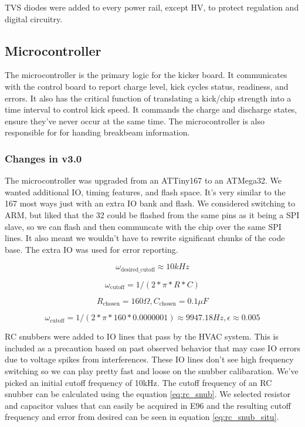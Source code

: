\documentclass[12pt, letterpaper]{article}
\begin{document}
TVS diodes were added to every power rail, except HV, to protect regulation and digital circuitry.

\subsection{Microcontroller}
The microcontroller is the primary logic for the kicker board. It communicates with the control board to report charge level, kick cycles status, readiness, and errors. It also has the critical function of translating a kick/chip strength into a time interval to control kick speed. It commands the charge and discharge states, ensure they've never occur at the same time. The microcontroller is also responsible for for handing breakbeam information.

\subsubsection{Changes in v3.0}
The microcontroller was upgraded from an ATTiny167 to an ATMega32. We wanted additional IO, timing features, and flash space. It's very similar to the 167 most ways just with an extra IO bank and flash. We considered switching to ARM, but liked that the 32 could be flashed from the same pins as it being a SPI slave, so we can flash and then communcate with the chip over the same SPI lines. It also meant we wouldn't have to rewrite significant chunks of the code base. The extra IO was used for error reporting.

$$ \omega_\mathrm{desired\_cutoff} \approx 10 kHz $$

\begin{equation} \label{eq:rc_snub}
\omega_\mathrm{cutoff} = 1 / (2 * \pi * R * C)
\end{equation}

$$ R_\mathrm{chosen} = 160 \Omega, C_\mathrm{chosen} = 0.1 \mu F $$

\begin{equation} \label{eq:rc_snub_situ}
\omega_\mathrm{cutoff} = 1 / (2 * \pi * 160 * 0.0000001) \approx 9947.18 Hz, \epsilon \approx 0.005
\end{equation}

RC snubbers were added to IO lines that pass by the HVAC system. This is included as a precaution based on past observed behavior that may case IO errors due to voltage spikes from interferences. These IO lines don't see high frequency switching so we can play pretty fast and loose on the snubber calibaration. We've picked an initial cutoff frequency of 10kHz. The cutoff frequency of an RC snubber can be calculated using the equation \ref{eq:rc_snub}. We selected resistor and capacitor values that can easily be acquired in E96 and the resulting cutoff frequency and error from desired can be seen in equation \ref{eq:rc_snub_situ}.
\end{document}
